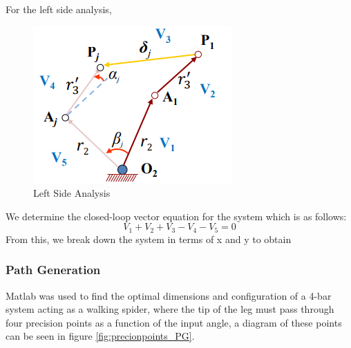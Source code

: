 \documentclass[12pt]{article}
\begin{document}
For the left side analysis,
\begin{figure}
    \centering
    \includegraphics{MG_4.png}
    \caption{Left Side Analysis}
\end{figure}
We determine the closed-loop vector equation for the system which is as follows:
\begin{equation}
    V_1+V_2+V_3-V_4-V_5=0
\end{equation}
From this, we break down the system in terms of x and y to obtain
\subsubsection{Path Generation}
Matlab was used to find the optimal dimensions and configuration of a 4-bar system acting as a walking spider, where the tip of the leg must pass through four precision points as a function of the input angle, a diagram of these points can be seen in figure \ref{fig:precionpoints_PG}.
\end{document}

